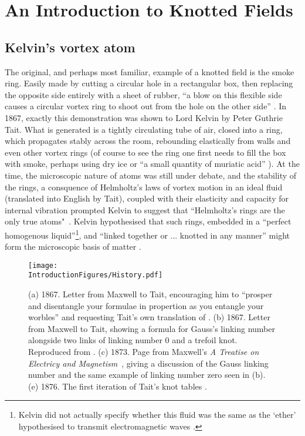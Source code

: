 \chapter{An Introduction to Knotted Fields}

\section{Kelvin's vortex atom}
\label{sec:Kelvin}
The original, and perhaps most familiar, example of a knotted field is the smoke ring. Easily made by cutting a circular hole in a rectangular box, then replacing the opposite side entirely with a sheet of rubber, ``a blow on this flexible side causes a circular vortex ring to shoot out from the hole on the other side'' \citep{Kelvin}. In 1867, exactly this demonstration was shown to Lord Kelvin by Peter Guthrie Tait. What is generated is a tightly circulating tube of air, closed into a ring, which propagates stably across the room, rebounding elastically from walls and even other vortex rings (of course to see the ring one first needs to fill the box with smoke, perhaps using dry ice or ``a small quantity of muriatic acid'' \citep{Kelvin}). At the time, the microscopic nature of atoms was still under debate, and the stability of the rings, a consquence of Helmholtz's laws of vortex motion in an ideal fluid \citep{Helmholtz} (translated into English by Tait), coupled with their elasticity and capacity for internal vibration \citep{KelvinMasters, KelvinAMS} prompted Kelvin to suggest that ``Helmholtz's rings are the only true atoms"~\citep{Kelvin}. Kelvin hypothesised that such rings, embedded in a ``perfect homogenous liquid''\footnote{Kelvin did not actually specify whether this fluid was the same as the `ether' hypothesised to transmit electromagnetic waves \citep{KelvinMasters}.}, and ``linked together or ... knotted in any manner'' might form the microscopic basis of matter \citep{Kelvin}.
\begin{figure}[htbp]
\centering
\texttt{[image: \\IntroductionFigures/History.pdf]}
\caption{(a) 1867. Letter from Maxwell to Tait, encouraging him to ``prosper and disentangle your formulae in propertion as you entangle your worbles'' and requesting Tait's own translation of \citep{Helmholtz}. (b) 1867. Letter from Maxwell to Tait, showing a formula for Gauss's linking number alongside two links of linking number 0 and a trefoil knot. Reproduced from \citep{Ricca2011}. (c) 1873. Page from Maxwell's \emph{A Treatise on Electricy and Magnetism}~\citep{Maxwell2}, giving a discussion of the Gauss linking number and the same example of linking number zero seen in (b). (e) 1876. The first iteration of Tait's knot tables \citep{Tait1}.}
\label{fig:History}
\end{figure}

